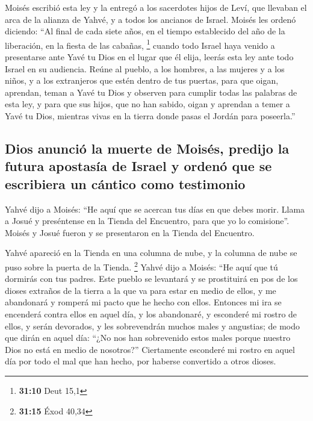  Moisés escribió esta ley y la entregó a los sacerdotes
hijos de Leví, que llevaban el arca de la alianza de Yahvé, y a todos
los ancianos de Israel.  Moisés les ordenó diciendo: ``Al
final de cada siete años, en el tiempo establecido del año de la
liberación, en la fiesta de las cabañas, \footnote{\textbf{31:10} Deut
  15,1}  cuando todo Israel haya venido a presentarse
ante Yavé tu Dios en el lugar que él elija, leerás esta ley ante todo
Israel en su audiencia.  Reúne al pueblo, a los hombres,
a las mujeres y a los niños, y a los extranjeros que estén dentro de tus
puertas, para que oigan, aprendan, teman a Yavé tu Dios y observen para
cumplir todas las palabras de esta ley,  y para que sus
hijos, que no han sabido, oigan y aprendan a temer a Yavé tu Dios,
mientras vivas en la tierra donde pasas el Jordán para poseerla.''

\hypertarget{dios-anunciuxf3-la-muerte-de-moisuxe9s-predijo-la-futura-apostasuxeda-de-israel-y-ordenuxf3-que-se-escribiera-un-cuxe1ntico-como-testimonio}{%
\subsection{Dios anunció la muerte de Moisés, predijo la futura
apostasía de Israel y ordenó que se escribiera un cántico como
testimonio}\label{dios-anunciuxf3-la-muerte-de-moisuxe9s-predijo-la-futura-apostasuxeda-de-israel-y-ordenuxf3-que-se-escribiera-un-cuxe1ntico-como-testimonio}}

 Yahvé dijo a Moisés: ``He aquí que se acercan tus días
en que debes morir. Llama a Josué y preséntense en la Tienda del
Encuentro, para que yo lo comisione''. Moisés y Josué fueron y se
presentaron en la Tienda del Encuentro.

 Yahvé apareció en la Tienda en una columna de nube, y la
columna de nube se puso sobre la puerta de la Tienda. \footnote{\textbf{31:15}
  Éxod 40,34}  Yahvé dijo a Moisés: ``He aquí que tú
dormirás con tus padres. Este pueblo se levantará y se prostituirá en
pos de los dioses extraños de la tierra a la que va para estar en medio
de ellos, y me abandonará y romperá mi pacto que he hecho con ellos.
 Entonces mi ira se encenderá contra ellos en aquel día,
y los abandonaré, y esconderé mi rostro de ellos, y serán devorados, y
les sobrevendrán muchos males y angustias; de modo que dirán en aquel
día: ``¿No nos han sobrevenido estos males porque nuestro Dios no está
en medio de nosotros?''  Ciertamente esconderé mi rostro
en aquel día por todo el mal que han hecho, por haberse convertido a
otros dioses.

